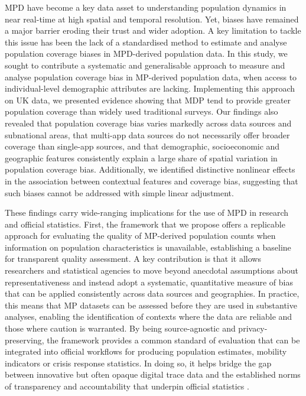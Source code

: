 \documentclass[]{rsos}%
\begin{document}
MPD have become a key data asset to understanding population dynamics in
near real-time at high spatial and temporal resolution. Yet, biases have
remained a major barrier eroding their trust and wider adoption. A key
limitation to tackle this issue has been the lack of a standardised
method to estimate and analyse population coverage biases in MPD-derived
population data. In this study, we sought to contribute a systematic and
generalisable approach to measure and analyse population coverage bias
in MP-derived population data, when access to individual-level
demographic attributes are lacking. Implementing this approach on UK
data, we presented evidence showing that MDP tend to provide greater
population coverage than widely used traditional surveys. Our findings
also revealed that population coverage bias varies markedly across data
sources and subnational areas, that multi-app data sources do not
necessarily offer broader coverage than single-app sources, and that
demographic, socioeconomic and geographic features consistently explain
a large share of spatial variation in population coverage bias.
Additionally, we identified distinctive nonlinear effects in the
association between contextual features and coverage bias, suggesting
that such biases cannot be addressed with simple linear adjustment.

These findings carry wide-ranging implications for the use of MPD in
research and official statistics. First, the framework that we propose
offers a replicable approach for evaluating the quality of MP-derived
population counts when information on population characteristics is
unavailable, establishing a baseline for transparent quality assessment.
A key contribution is that it allows researchers and statistical
agencies to move beyond anecdotal assumptions about representativeness
and instead adopt a systematic, quantitative measure of bias that can be
applied consistently across data sources and geographies. In practice,
this means that MP datasets can be assessed before they are used in
substantive analyses, enabling the identification of contexts where the
data are reliable and those where caution is warranted. By being
source-agnostic and privacy-preserving, the framework provides a common
standard of evaluation that can be integrated into official workflows
for producing population estimates, mobility indicators or crisis
response statistics. In doing so, it helps bridge the gap between
innovative but often opaque digital trace data and the established norms
of transparency and accountability that underpin official statistics
\citep{unstatsMPDMS2025}.
\end{document}
